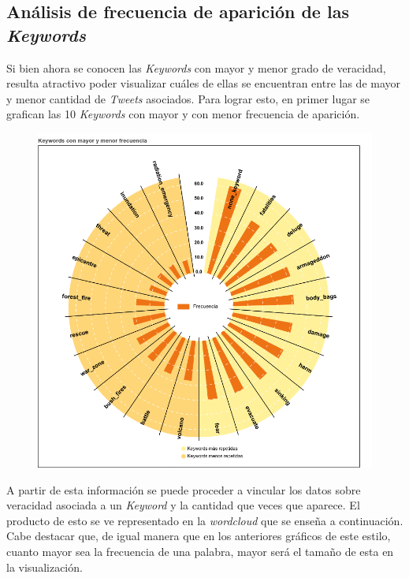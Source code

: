 \documentclass[titlepage,a4paper]{article}
\begin{document}
    \subsection{Análisis de frecuencia de aparición de las \textit{Keywords}}
    Si bien ahora se conocen las \textit{Keywords} con mayor y menor grado de veracidad, resulta atractivo poder visualizar cuáles de ellas se encuentran entre las de mayor y menor cantidad de \textit{Tweets} asociados. Para lograr esto, en primer lugar se grafican las 10 \textit{Keywords} con mayor y con menor frecuencia de aparición.
    \begin{figure}[H]
    \centering
    \includegraphics[width=1\textwidth]{graficos/Analisis de Keyword/rosquete_keywords_repetidas.png}
    \caption{} 
    \end{figure}
    
    A partir de esta información se puede proceder a vincular los datos sobre veracidad asociada a un \textit{Keyword} y la cantidad que veces que aparece. El producto de esto se ve representado en la \textit{wordcloud} que se enseña a continuación. Cabe destacar que, de igual manera que en los anteriores gráficos de este estilo, cuanto mayor sea la frecuencia de una palabra, mayor será el tamaño de esta en la visualización.
    
\end{document}
